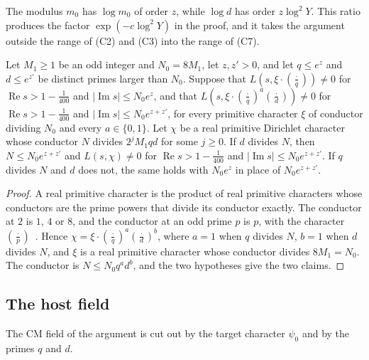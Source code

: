 The modulus $m_0$ has $\log m_0$ of order $z$, while $\log d$ has order $z\log^2Y$. This ratio produces the factor $\exp(-c\log^2Y)$ in the proof, and it takes the argument outside the range of (C2) and (C3) into the range of (C7).

\begin{corollary}\label{realbox}
Let $M_1\ge1$ be an odd integer and $N_0=8M_1$, let $z,z'>0$, and let $q\le e^z$ and $d\le e^{z'}$ be distinct primes larger than $N_0$. Suppose that $L(s,\xi\cdot(\frac{\cdot}{q}))\ne0$ for $\operatorname{Re}s>1-\frac1{400}$ and $\lvert\operatorname{Im}s\rvert\le N_0e^z$, and that $L(s,\xi\cdot(\frac{\cdot}{q})^a(\frac{\cdot}{d}))\ne0$ for $\operatorname{Re}s>1-\frac1{400}$ and $\lvert\operatorname{Im}s\rvert\le N_0e^{z+z'}$, for every primitive character $\xi$ of conductor dividing $N_0$ and every $a\in\{0,1\}$. Let $\chi$ be a real primitive Dirichlet character whose conductor $N$ divides $2^jM_1qd$ for some $j\ge0$. If $d$ divides $N$, then $N\le N_0e^{z+z'}$ and $L(s,\chi)\ne0$ for $\operatorname{Re}s>1-\frac1{400}$ and $\lvert\operatorname{Im}s\rvert\le N_0e^{z+z'}$. If $q$ divides $N$ and $d$ does not, the same holds with $N_0e^z$ in place of $N_0e^{z+z'}$.
\end{corollary}

\begin{proof}
A real primitive character is the product of real primitive characters whose conductors are the prime powers that divide its conductor exactly. The conductor at $2$ is $1$, $4$ or $8$, and the conductor at an odd prime $p$ is $p$, with the character $(\frac{\cdot}{p})$~\cite[Ch.~5]{davenport}. Hence $\chi=\xi\cdot(\frac{\cdot}{q})^a(\frac{\cdot}{d})^b$, where $a=1$ when $q$ divides $N$, $b=1$ when $d$ divides $N$, and $\xi$ is a real primitive character whose conductor divides $8M_1=N_0$. The conductor is $N\le N_0q^ad^b$, and the two hypotheses give the two claims.
\end{proof}

\subsection{The host field}\label{sec:field}

The CM field of the argument is cut out by the target character $\psi_0$ and by the primes $q$ and $d$.

